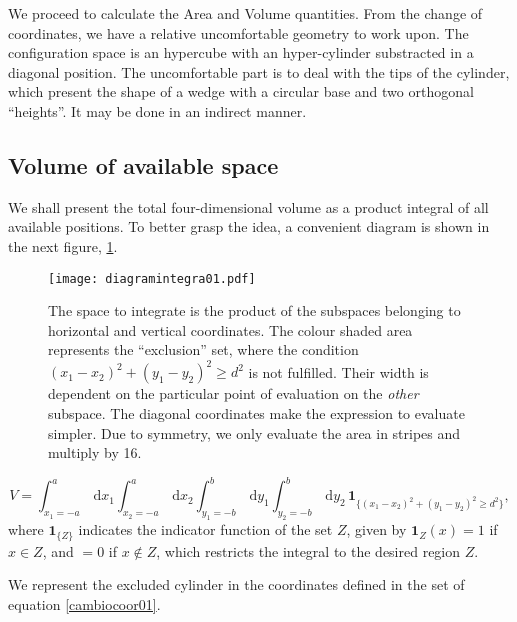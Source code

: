 \documentclass[a4paper,10pt]{article}
\newcommand{\rd}{\, \mathrm{d}}
\newcommand{\indicator}[1]{\mathbf{1}_{ \{   #1 \} } }
\begin{document}
We proceed to calculate the Area and Volume quantities. From the change of coordinates,
we have a relative uncomfortable geometry to work upon. The configuration
space is an hypercube with an hyper-cylinder substracted in a diagonal position.
The uncomfortable part is to deal with the tips of the cylinder, which
present the  shape of a wedge with a circular base and two 
orthogonal ``heights''. It may be done in an indirect manner.


\subsection{Volume of available space}


We shall present the total four-dimensional volume as a product integral
of all available positions. To better grasp the idea, a convenient
diagram is shown in the next figure, \ref{diagintegra01}.

\begin{figure}[h]
  \centering
  \texttt{[image: diagramintegra01.pdf]}
  \caption{The space to integrate is the product of the subspaces
    belonging to horizontal and vertical coordinates. The colour
    shaded area represents the ``exclusion'' set, where the condition 
    $ (x_1-x_2)^2 + (y_1-y_2)^2 \ge d^2 $ is not fulfilled. 
    Their width is dependent on the particular point of evaluation
    on the \emph{other} subspace. The diagonal coordinates
    make the expression to evaluate simpler. Due to 
    symmetry, we only evaluate the area in stripes and
    multiply by 16.}\label{diagintegra01}
\end{figure}

\begin{equation}
 V = \int_{x_1 = -a}^a \rd x_1 \int_{x_2 = -a}^a \rd x_2 
\int_{y_1 = -b}^b \rd y_1 \int_{y_2 = -b}^b \rd y_2 \, \indicator{ (x_1-x_2)^2 + (y_1-y_2)^2 \ge d^2 },
\end{equation}
where $\indicator{Z}$ indicates the indicator function of the set $Z$, given by $\mathbf{1}_Z (x) = 1$ if $x \in Z$, and $=0$ if $x \notin Z$, which restricts the integral to the desired region $Z$.

We represent the excluded cylinder in the coordinates defined in 
the set of equation \ref{cambiocoor01}. 
\end{document}
